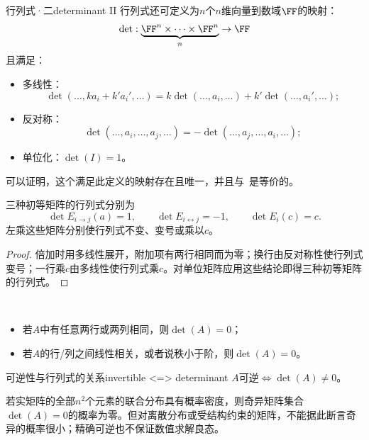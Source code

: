 \begin{definition}
	{行列式·二}{determinant II}
	行列式还可定义为$n$个$n$维向量到数域$\FF$的映射：
	\[
		\det:\underbrace{\FF^n\times\cdots\times\FF^n}_n\to\FF
	\]
	且满足：
	\begin{itemize}
		\item 多线性：
		\begin{equation}
			\det(\ldots,ka_i+k'a_i',\ldots)=k\det(\ldots,a_i,\ldots)+k'\det(\ldots,a_i',\ldots);
		\end{equation}
		\item 反对称：
		\begin{equation}
			\det(\ldots,a_i,\ldots,a_j,\ldots)=-\det(\ldots,a_j,\ldots,a_i,\ldots);
		\end{equation}
		\item 单位化：$\det(I)=1$。
	\end{itemize}
	可以证明，这个满足此定义的映射存在且唯一，并且与~是等价的。
\end{definition}
\begin{lemma}
	三种初等矩阵的行列式分别为
	\[
		\det E_{i\to j}(a)=1,\qquad
		\det E_{i\leftrightarrow j}=-1,\qquad
		\det E_i(c)=c.
	\]
	左乘这些矩阵分别使行列式不变、变号或乘以$c$。
\end{lemma}
\begin{proof}
	倍加时用多线性展开，附加项有两行相同而为零；换行由反对称性使行列式变号；一行乘$c$由多线性使行列式乘$c$。对单位矩阵应用这些结论即得三种初等矩阵的行列式。
\end{proof}
\begin{corollary}
	~%
	\begin{itemize}
		\item 若$A$中有任意两行或两列相同，则$\det(A)=0$；
		\item 若$A$的行/列之间线性相关，或者说秩小于阶，则$\det(A)=0$。
	\end{itemize}
\end{corollary}


\begin{theorem}
	{可逆性与行列式的关系}{invertible <=> determinant}
	$A$可逆$\iff\det(A)\neq 0$。
\end{theorem}

\begin{remark}
	若实矩阵的全部$n^2$个元素的联合分布具有概率密度，则奇异矩阵集合$\det(A)=0$的概率为零。但对离散分布或受结构约束的矩阵，不能据此断言奇异的概率很小；精确可逆也不保证数值求解良态。
\end{remark}

